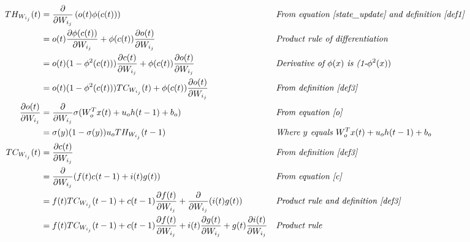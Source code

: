 \documentclass{article}
\begin{document}
\begin{align*}
TH_{W_{i_j}}(t) & = \frac{\partial}{\partial W_{i_j}} \left ( o(t) \phi(c(t)) \right ) && \textit{From equation \ref{state_update} and definition \ref{def1}} \\
& = o(t) \frac{\partial \phi(c(t))}{\partial W_{i_j}}  + \phi(c(t)) \frac{\partial o(t)}{\partial W_{i_j}}   && \textit{Product rule of differentiation} \\
&= o(t) (1-\phi^{2}(c(t))) \frac{\partial c(t)}{\partial W_{i_j}}  + \phi(c(t)) \frac{\partial o(t)}{\partial W_{i_j}}   && \textit{Derivative of $\phi(x)$ is (1-$\phi^2(x))$}\\ 
&= o(t) (1-\phi^{2}(c(t))) TC_{W_{i_j}}(t)  + \phi(c(t)) \frac{\partial o(t)}{\partial W_{i_j}}   && \textit{From definition \ref{def3}}\\ 
\frac{\partial o(t)}{\partial W_{i_j}} &=  \frac{\partial}{\partial W_{i_j}} \sigma(W_{o}^T x(t) + u_{o} h(t-1) + b_o) && \textit{From equation \ref{o}}\\
&= \sigma(y)(1-\sigma(y))u_o TH_{W_{i_j}}(t-1) && \textit{Where $y$ equals $W_{o}^T x(t) + u_{o} h(t-1) + b_o$} \\
TC_{W_{i_j}}(t) &=  \frac{\partial c(t)}{\partial W_{i_j}} && \textit{From definition \ref{def3}} \\ 
&=  \frac{\partial}{\partial W_{i_j}} (f(t)  c(t-1) + i(t) g(t))  && \textit{From equation \ref{c}} \\
&= f(t) TC_{W_{i_j}}(t-1) + c(t-1)\frac{\partial f(t)}{ \partial W_{i_j}} + \frac{\partial}{\partial W_{i_j}} ( i(t) g(t) )   && \textit{Product rule and definition \ref{def3}}\\
&= f(t) TC_{W_{i_j}}(t-1) + c(t-1)\frac{\partial f(t)}{ \partial W_{i_j}} + i(t)\frac{\partial g(t) }{\partial W_{i_j}}  + g(t)\frac{\partial i(t) }{\partial W_{i_j}}  && \textit{Product rule} 
\end{align*}


\end{document}
